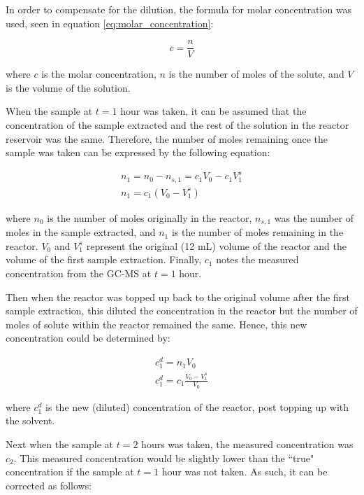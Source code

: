In order to compensate for the dilution, the formula for molar concentration was used, seen in equation \ref{eq:molar_concentration}:

\begin{equation}
    c = \frac{n}{V}
    \label{eq:molar_concentration}
\end{equation}

where $c$ is the molar concentration, $n$ is the number of moles of the solute, and $V$ is the volume of the solution.

When the sample at $t=1$ hour was taken, it can be assumed that the concentration of the sample extracted and the rest of the solution in the reactor reservoir was the same. Therefore, the number of moles remaining once the sample was taken can be expressed by the following equation:

\begin{equation}
\begin{aligned} 
    n_1 = n_0 - n_{s,1} = c_1V_0 - c_1V_1^s \\
    n_1 = c_1(V_0 - V_1^s)
    \label{eq:corrected_concentration_1}
\end{aligned}
\end{equation}

where $n_0$ is the number of moles originally in the reactor, $n_{s,1}$ was the number of moles in the sample extracted, and $n_1$ is the number of moles remaining in the reactor. $V_0$ and $V_1^s$ represent the original (12 mL) volume of the reactor and the volume of the first sample extraction. Finally, $c_1$ notes the measured concentration from the GC-MS at $t=1$ hour.

Then when the reactor was topped up back to the original volume after the first sample extraction, this diluted the concentration in the reactor but the number of moles of solute within the reactor remained the same. Hence, this new concentration could be determined by:

\begin{equation}
\begin{aligned} 
    c_1^d = n_1V_0 \\
    c_1^d = c_1 \frac{V_0 - V_1^s}{V_0}
    \label{eq:corrected_concentration_2}
\end{aligned} 
\end{equation}

where $c_1^d$ is the new (diluted) concentration of the reactor, post topping up with the solvent. 

Next when the sample at $t=2$ hours was taken, the measured concentration was $c_2$. This measured concentration would be slightly lower than the ``true" concentration if the sample at $t=1$ hour was not taken. As such, it can be corrected as follows:

